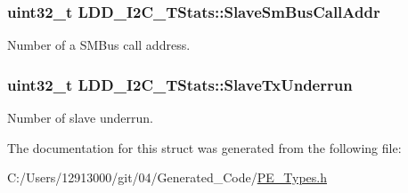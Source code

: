 \subsubsection[{Slave\+Sm\+Bus\+Call\+Addr}]{\setlength{\rightskip}{0pt plus 5cm}uint32\+\_\+t L\+D\+D\+\_\+\+I2\+C\+\_\+\+T\+Stats\+::\+Slave\+Sm\+Bus\+Call\+Addr}\label{struct_l_d_d___i2_c___t_stats_a134cb9fb9e37217e70e8a93924bca300}
Number of a S\+M\+Bus call address. \hypertarget{struct_l_d_d___i2_c___t_stats_add2f9914a1ea98c3bf86c0cab84e6a8c}{}
\subsubsection[{Slave\+Tx\+Underrun}]{\setlength{\rightskip}{0pt plus 5cm}uint32\+\_\+t L\+D\+D\+\_\+\+I2\+C\+\_\+\+T\+Stats\+::\+Slave\+Tx\+Underrun}\label{struct_l_d_d___i2_c___t_stats_add2f9914a1ea98c3bf86c0cab84e6a8c}
Number of slave underrun. 

The documentation for this struct was generated from the following file\+:\begin{DoxyCompactItemize}
\item 
C\+:/\+Users/12913000/git/04/\+Generated\+\_\+\+Code/\hyperlink{_p_e___types_8h}{P\+E\+\_\+\+Types.\+h}\end{DoxyCompactItemize}

